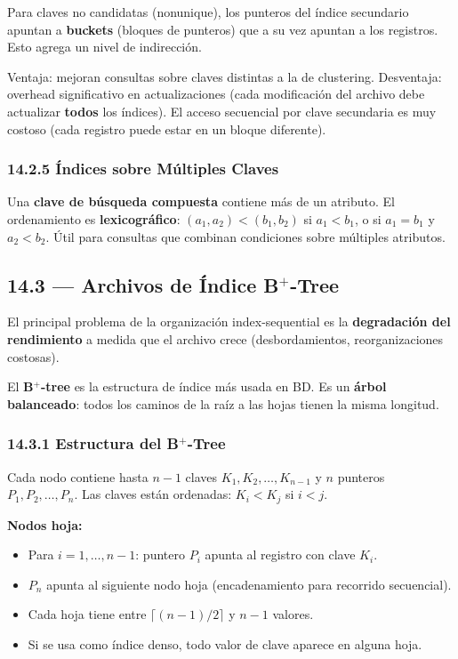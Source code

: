 \documentclass[11pt, a4paper]{article}
\begin{document}
Para claves no candidatas (nonunique), los punteros del índice secundario apuntan a \textbf{buckets} (bloques de punteros) que a su vez apuntan a los registros. Esto agrega un nivel de indirección.

Ventaja: mejoran consultas sobre claves distintas a la de clustering. Desventaja: overhead significativo en actualizaciones (cada modificación del archivo debe actualizar \textbf{todos} los índices). El acceso secuencial por clave secundaria es muy costoso (cada registro puede estar en un bloque diferente).

\subsubsection{14.2.5 Índices sobre Múltiples Claves}

Una \textbf{clave de búsqueda compuesta} contiene más de un atributo. El ordenamiento es \textbf{lexicográfico}: $(a_1, a_2) < (b_1, b_2)$ si $a_1 < b_1$, o si $a_1 = b_1$ y $a_2 < b_2$. Útil para consultas que combinan condiciones sobre múltiples atributos.

\subsection{14.3 --- Archivos de Índice B$^+$-Tree}

El principal problema de la organización index-sequential es la \textbf{degradación del rendimiento} a medida que el archivo crece (desbordamientos, reorganizaciones costosas).

El \textbf{B$^+$-tree} es la estructura de índice más usada en BD. Es un \textbf{árbol balanceado}: todos los caminos de la raíz a las hojas tienen la misma longitud.

\subsubsection{14.3.1 Estructura del B$^+$-Tree}

Cada nodo contiene hasta $n-1$ claves $K_1, K_2, \ldots, K_{n-1}$ y $n$ punteros $P_1, P_2, \ldots, P_n$. Las claves están ordenadas: $K_i < K_j$ si $i < j$.

\textbf{Nodos hoja:}
\begin{itemize}[nosep]
	\item Para $i = 1, \ldots, n-1$: puntero $P_i$ apunta al registro con clave $K_i$.
	\item $P_n$ apunta al siguiente nodo hoja (encadenamiento para recorrido secuencial).
	\item Cada hoja tiene entre $\lceil (n-1)/2 \rceil$ y $n-1$ valores.
	\item Si se usa como índice denso, todo valor de clave aparece en alguna hoja.
\end{itemize}
\end{document}

